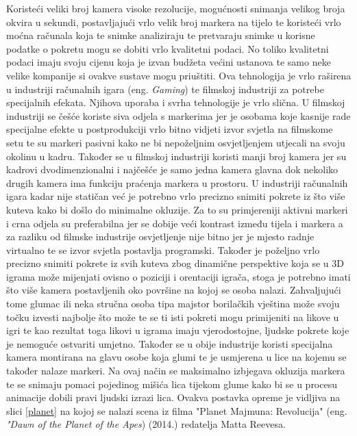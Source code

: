 \documentclass[times, utf8, diplomski]{fer}
\begin{document}
Koristeći veliki broj kamera visoke rezolucije, mogućnosti snimanja velikog broja okvira u sekundi, postavljajući vrlo velik broj 
markera na tijelo te koristeći vrlo moćna računala koja te snimke analiziraju te pretvaraju snimke u korisne podatke o pokretu
mogu se dobiti vrlo kvalitetni podaci. No toliko kvalitetni podaci imaju svoju cijenu koja je izvan budžeta većini ustanova te samo 
neke velike kompanije si ovakve sustave mogu priuštiti. Ova tehnologija je vrlo raširena u industriji računalnih igara
(eng. \textit{Gaming}) te filmskoj industriji za potrebe specijalnih efekata. Njihova uporaba i svrha tehnologije je vrlo slična.
U filmskoj industriji se češće koriste siva odjela s markerima jer je osobama koje kasnije rade specijalne efekte u postprodukciji
vrlo bitno vidjeti izvor svjetla na filmskome setu te su markeri pasivni kako ne bi nepoželjnim osvjetljenjem utjecali na svoju
okolinu u kadru. Također se u filmskoj industriji koristi manji broj kamera jer su kadrovi dvodimenzionalni i najčešće je samo
jedna kamera glavna dok nekoliko drugih kamera ima funkciju praćenja markera u prostoru. U industriji računalnih igara kadar nije
statičan već je potrebno vrlo precizno snimiti pokrete iz što više kuteva kako bi došlo do minimalne okluzije. Za to su primjereniji
aktivni markeri i crna odjela su preferabilna jer se dobije veći kontrast između tijela i markera a za razliku od filmske industrije
osvjetljenje nije bitno jer je mjesto radnje virtualno te se izvor svjetla postavlja programski. Također je poželjno vrlo precizno
snimiti pokrete iz svih kuteva zbog dinamične perspektive koja se u 3D igrama može mijenjati ovisno o poziciji i orentaciji igrača,
stoga je potrebno imati što više kamera postavljenih oko površine na kojoj se osoba nalazi. Zahvaljujući tome glumac ili neka stručna 
osoba tipa majstor borilačkih vještina može svoju točku izvesti najbolje što može te se ti isti pokreti mogu primijeniti na likove
u igri te kao rezultat toga likovi u igrama imaju vjerodostojne, ljudske pokrete koje je nemoguće ostvariti umjetno. Također se u
obije industrije koristi specijalna kamera montirana na glavu osobe koja glumi te je usmjerena u lice na kojemu se također nalaze
markeri. Na ovaj način se maksimalno izbjegava okluzija markera te se snimaju pomaci pojedinog mišića lica tijekom glume kako 
bi se u procesu animacije dobili pravi ljudski izrazi lica. Ovakva postavka opreme je vidljiva na slici \ref{planet} na kojoj se
nalazi scena iz filma "Planet Majmuna: Revolucija" (eng. \textit{"Dawn of the Planet of the Apes}) (2014.) redatelja Matta Reevesa.
\end{document}
